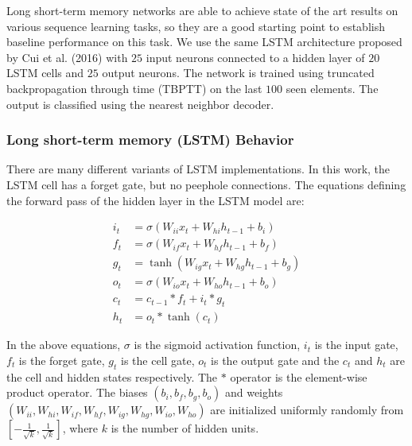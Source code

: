 \documentclass{article}
\begin{document}
Long short-term memory \cite{hochreiter1997long} networks are able to achieve state of the art results on various sequence learning tasks, so they are a good starting point to establish baseline performance on this task. We use the same LSTM architecture proposed by Cui et al. (2016) with $25$ input neurons connected to a hidden layer of $20$ LSTM cells and $25$ output neurons. The network is trained using truncated backpropagation through time (TBPTT) \cite{mozer1995focused, sutskever2013training} on the last $100$ seen elements. The output is classified using the nearest neighbor decoder.

\subsubsection*{Long short-term memory (LSTM) Behavior}
There are many different variants of LSTM implementations. In this work, the LSTM cell has a forget gate, but no peephole connections. The equations defining the forward pass of the hidden layer in the LSTM model are:

\begin{align}
    i_t &= \sigma\left(W_{ii}x_t + W_{hi}h_{t-1} + b_i\right)\\
    f_t &= \sigma\left(W_{if}x_t + W_{hf}h_{t-1} + b_f\right)\\
    g_t &= \tanh\left(W_{ig}x_t + W_{hg}h_{t-1} + b_g\right)\\
    o_t &= \sigma\left(W_{io}x_t + W_{ho}h_{t-1} + b_o\right)\\
    c_t &= c_{t-1}\ast f_t + i_t \ast g_t\\
    h_t &= o_t \ast \tanh\left(c_t\right)
\end{align}

In the above equations, $\sigma$ is the sigmoid activation function, $i_t$ is the input gate, $f_t$ is the forget gate, $g_t$ is the cell gate, $o_t$ is the output gate and the $c_t$ and $h_t$ are the cell and hidden states respectively. The $\ast$ operator is the element-wise product operator. The biases $\left(b_i, b_f, b_g, b_o\right)$ and weights $\left(W_{ii}, W_{hi}, W_{if}, W_{hf}, W_{ig}, W_{hg},W_{io}, W_{ho}\right)$ are initialized uniformly randomly from $\left[-\frac{1}{\sqrt{k}}, \frac{1}{\sqrt{k}}\right]$, where $k$ is the number of hidden units. \cite{jozefowicz2015empirical} 
\end{document}
